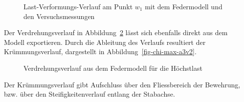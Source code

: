 \documentclass[
  10pt,
  letterpaper,
]{scrreprt}
\begin{document}
\begin{figure}[H]


\caption{\label{fig-fwa3v2}Last-Verformungs-Verlauf am Punkt \(w_1\) mit
dem Federmodell und den Versuchsmessungen}

\end{figure}%

Der Verdrehungsverlauf in Abbildung~\ref{fig-phi-max-a3v2} lässt sich
ebenfalls direkt aus dem Modell exportieren. Durch die Ableitung des
Verlaufs resultiert der Krümmungsverlauf, dargestellt in
Abbildung~\ref{fig-chi-max-a3v2}.

\begin{figure}[H]


\caption{\label{fig-phi-max-a3v2}Verdrehungsverlauf aus dem Federmodell
für die Höchstlast}

\end{figure}%

Der Krümmungsverlauf gibt Aufschluss über den Fliessbereich der
Bewehrung, bzw. über den Steifigkeitenverlauf entlang der Stabachse.
\end{document}
